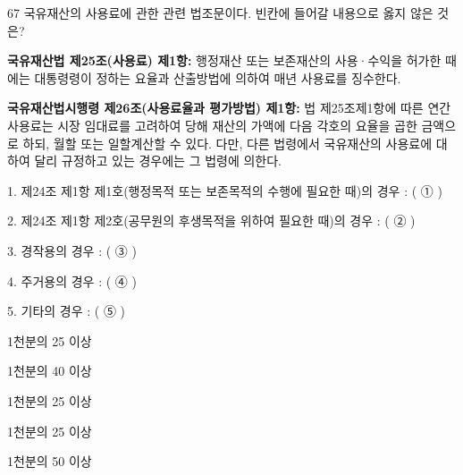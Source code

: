 \begin{question}{67}
국유재산의 사용료에 관한 관련 법조문이다. 빈칸에 들어갈 내용으로 옳지 않은 것은?
\begin{framedtext}
\textbf{국유재산법 제25조(사용료) 제1항:} 행정재산 또는 보존재산의 사용·수익을 허가한 때에는 대통령령이 정하는 요율과 산출방법에 의하여 매년 사용료를 징수한다. \par
\textbf{국유재산법시행령 제26조(사용료율과 평가방법) 제1항:} 법 제25조제1항에 따른 연간 사용료는 시장 임대료를 고려하여 당해 재산의 가액에 다음 각호의 요율을 곱한 금액으로 하되, 월할 또는 일할계산할 수 있다. 다만, 다른 법령에서 국유재산의 사용료에 대하여 달리 규정하고 있는 경우에는 그 법령에 의한다. \par
1. 제24조 제1항 제1호(행정목적 또는 보존목적의 수행에 필요한 때)의 경우 : ( ① ) \par
2. 제24조 제1항 제2호(공무원의 후생목적을 위하여 필요한 때)의 경우 : ( ② ) \par
3. 경작용의 경우 : ( ③ ) \par
4. 주거용의 경우 : ( ④ ) \par
5. 기타의 경우 : ( ⑤ )
\end{framedtext}
\begin{choices}
  \item 1천분의 25 이상
  \item 1천분의 40 이상
  \item 1천분의 25 이상
  \item 1천분의 25 이상
  \item 1천분의 50 이상
\end{choices}
\end{question}
